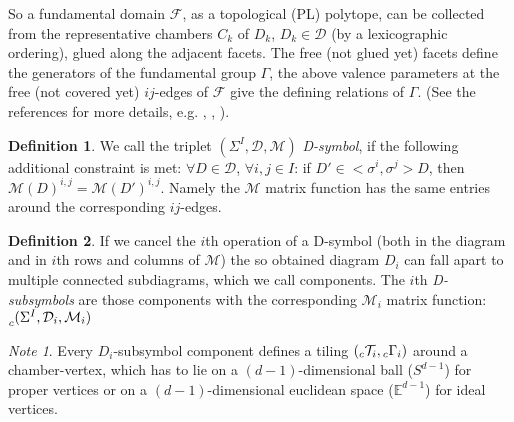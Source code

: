 \documentclass[12pt,a4paper]{article}
\numberwithin{equation}{section}
\newcommand{\leftsub}[2]{{\vphantom{#2}}_{#1}{#2}}
\theoremstyle{plain}%
\theoremstyle{definition}
\newtheorem{defn}{Definition}[section]
\theoremstyle{remark}
\newtheorem*{note}{Note}
\begin{document}
So a fundamental domain $\mathcal{F}$, as a topological (PL) polytope, can be collected
from the representative chambers $C_k$ of $D_k$, $D_k\in\mathcal{D}$ (by a
lexicographic ordering), glued along the adjacent facets. The free (not glued
yet) facets define the generators of the fundamental group $\Gamma$, the above
valence parameters at the free (not covered yet) $ij$-edges of $\mathcal{F}$
give the defining relations of $\Gamma$. (See the references for more details,
e.g. \cite{DHM93}, \cite{M96}, \cite{M11}).

\begin{defn}
  We call the triplet $(\Sigma^I,\mathcal{D},\mathcal{M})$ {\em D-symbol}, if the
  following additional constraint is met:
  $\forall D\in \mathcal{D}$, $\forall i,j\in I$: if $D' \in
  <\sigma^i,\sigma^j>D$, then $\mathcal{M}(D)^{i,j}=\mathcal{M}(D')^{i,j}$.
  Namely the $\mathcal{M}$ matrix function has the same entries around the
  corresponding $ij$-edges.
\end{defn}


\begin{defn}
  If we cancel the $i$th operation of a D-symbol (both in the diagram and in
  $i$th rows and columns of $\mathcal{M}$) the so obtained diagram $D_i$ can fall apart to multiple
  connected subdiagrams, which we call components. The $i$th {\em D-subsymbols} are
  those components with the corresponding $\mathcal{M}_i$ matrix function:
  $\leftsub{c}{(\Sigma^I,\mathcal{D}_i,\mathcal{M}_i)}$
\end{defn}

\begin{note}
  Every $D_i$-subsymbol component defines a tiling
  $(\leftsub{c}{\mathcal{T}}_i,\leftsub{c}{\Gamma}_i)$ around a chamber-vertex, which has to lie
  on a $(d-1)$-dimensional ball ($S^{d-1}$) for proper vertices or on a $(d-1)$-dimensional
  euclidean space ($\mathbb{E}^{d-1}$) for ideal vertices.
\end{note}
\end{document}
